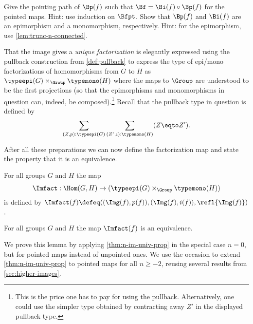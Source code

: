\begin{xca}\label{xca:p-epi-i-mono}
Give the pointing path of $\Bp(f)$ such that
$\Bf=\Bi(f)\circ\Bp(f)$ for the pointed maps. Hint: use induction on $\Bfpt$.
Show that $\Bp(f)$ and $\Bi(f)$ are an epimorphism and a monomorphism, respectively.
Hint: for the epimorphism, use \cref{lem:trunc-n-connected}.
\end{xca}

That the image gives a \emph{unique factorization} is elegantly expressed 
using the pullback construction from \cref{def:pullback} to express the 
type of epi/mono factorizations of homomorphisms from $G$ to $H$ as 
$\typeepi(G)\times_{\Group}\typemono(H)$ where the maps to $\Group$ are understood to be the first projections
(so that the epimorphisms and monomorphisms in question can, indeed, 
be composed).\footnote{%
This is the price one has to pay for using the pullback.
Alternatively, one could use the simpler type obtained by
contracting away $Z'$ in the displayed pullback type.}
Recall that the pullback type in question is defined by
\[
\sum_{(Z,p):\typeepi(G)}\sum_{(Z',i):\typemono(H)}(Z\eqto Z').
\]

After all these preparations we can now define the factorization map
and state the property that it is an equivalence.

\begin{definition}\label{def:Im-fact}
For all groups $G$ and $H$ the map
\[
\Imfact:\Hom(G,H) \to (\typeepi(G)\times_{\Group}\typemono(H))
\]
is defined by
$
\Imfact(f) \defeq ((\Img(f),p(f)),(\Img(f),i(f)),\refl{\Img(f)})
$.%
\end{definition}
\begin{lemma}\label{lem:Im-fact-unique}
For all groups $G$ and $H$ the map $\Imfact(f)$ is an equivalence.
\end{lemma}

We prove this lemma by applying \cref{thm:n-im-univ-prop} in the 
special case $n=0$, but for pointed maps instead of unpointed ones.
We use the occasion to extend \cref{thm:n-im-univ-prop} to
pointed maps for all $n\geq-2$, 
reusing several results from \cref{sec:higher-images}.


